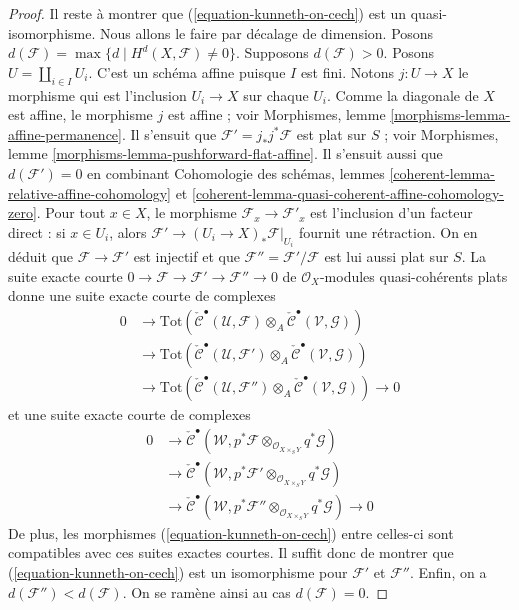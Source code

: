 \begin{proof}
\medskip\noindent
Il reste à montrer que (\ref{equation-kunneth-on-cech})
est un quasi-isomorphisme. Nous allons le faire par décalage de dimension.
Posons $d(\mathcal{F}) = \max \{d \mid H^d(X, \mathcal{F}) \not = 0\}$.
Supposons $d(\mathcal{F}) > 0$. Posons $U = \coprod\nolimits_{i \in I} U_i$.
C'est un schéma affine puisque $I$ est fini. Notons
$j : U \to X$ le morphisme qui est l'inclusion $U_i \to X$
sur chaque $U_i$. Comme la diagonale de $X$ est affine, le morphisme
$j$ est affine ; voir
Morphismes, lemme \ref{morphisms-lemma-affine-permanence}.
Il s'ensuit que $\mathcal{F}' = j_*j^*\mathcal{F}$ est plat sur $S$ ; voir
Morphismes, lemme \ref{morphisms-lemma-pushforward-flat-affine}.
Il s'ensuit aussi que $d(\mathcal{F}') = 0$ en combinant
Cohomologie des schémas, lemmes
\ref{coherent-lemma-relative-affine-cohomology} et
\ref{coherent-lemma-quasi-coherent-affine-cohomology-zero}.
Pour tout $x \in X$, le morphisme $\mathcal{F}_x  \to \mathcal{F}'_x$
est l'inclusion d'un facteur direct : si $x \in U_i$,
alors $\mathcal{F}' \to (U_i \to X)_*\mathcal{F}|_{U_i}$
fournit une rétraction. On en déduit que
$\mathcal{F} \to \mathcal{F}'$ est injectif et que
$\mathcal{F}'' = \mathcal{F}'/\mathcal{F}$
est lui aussi plat sur $S$. La suite exacte courte
$0 \to \mathcal{F} \to \mathcal{F}' \to \mathcal{F}'' \to 0$
de $\mathcal{O}_X$-modules quasi-cohérents plats
donne une suite exacte courte de complexes
$$
\begin{aligned}
0 &\to
\text{Tot}(
\check{\mathcal{C}}^\bullet(\mathcal{U}, \mathcal{F})
\otimes_A
\check{\mathcal{C}}^\bullet(\mathcal{V}, \mathcal{G})) \\
&\to
\text{Tot}(
\check{\mathcal{C}}^\bullet(\mathcal{U}, \mathcal{F}')
\otimes_A
\check{\mathcal{C}}^\bullet(\mathcal{V}, \mathcal{G})) \\
&\to
\text{Tot}(
\check{\mathcal{C}}^\bullet(\mathcal{U}, \mathcal{F}'')
\otimes_A
\check{\mathcal{C}}^\bullet(\mathcal{V}, \mathcal{G})) \to 0
\end{aligned}
$$
et une suite exacte courte de complexes
$$
\begin{aligned}
0 &\to
\check{\mathcal{C}}^\bullet(\mathcal{W},
p^*\mathcal{F}
\otimes_{\mathcal{O}_{X \times_S Y}}
q^*\mathcal{G}) \\
&\to
\check{\mathcal{C}}^\bullet(\mathcal{W},
p^*\mathcal{F}'
\otimes_{\mathcal{O}_{X \times_S Y}}
q^*\mathcal{G}) \\
&\to
\check{\mathcal{C}}^\bullet(\mathcal{W},
p^*\mathcal{F}''
\otimes_{\mathcal{O}_{X \times_S Y}}
q^*\mathcal{G}) \to 0
\end{aligned}
$$
De plus, les morphismes (\ref{equation-kunneth-on-cech}) entre celles-ci
sont compatibles avec ces suites exactes courtes. Il suffit donc de montrer que
(\ref{equation-kunneth-on-cech})
est un isomorphisme pour $\mathcal{F}'$ et $\mathcal{F}''$. Enfin,
on a $d(\mathcal{F}'') < d(\mathcal{F})$.
On se ramène ainsi au cas $d(\mathcal{F}) = 0$.


\end{proof}
